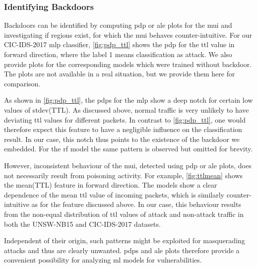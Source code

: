 \documentclass[10pt,sigconf,letterpaper,dvipsnames]{acmart}
\newcommand{\unsw}{UNSW-NB15}
\newcommand{\cic}{CIC-IDS-2017}
\begin{document}


\subsubsection{Identifying Backdoors}

Backdoors can be identified by computing \gls{pdp} or \gls{ale} plots for the \gls{mui} and investigating if regions exist, for which the \gls{mui} behaves counter-intuitive. For our \cic{} \gls{mlp} classifier, \autoref{fig:pdp_ttl} shows the \gls{pdp} for the \gls{ttl} value in forward direction, where the label 1 means classification as attack. We also provide plots for the corresponding models which were trained without backdoor. The plots are not available in a real situation, but we provide them here for comparison.

As shown in \autoref{fig:pdp_ttl}, the \glspl{pdp} for the \gls{mlp} show a deep notch for certain low values of stdev(TTL). As discussed above, normal traffic is very unlikely to have deviating \gls{ttl} values for different packets. In contrast to \autoref{fig:pdp_ttl}, one would therefore expect this feature to have a negligible influence on the classification result. In our case, this notch thus points to the existence of the backdoor we embedded. For the \gls{rf} model the same pattern is observed but omitted for brevity.

However, inconsistent behaviour of the \gls{mui}, detected using \gls{pdp} or \gls{ale} plots, does not necessarily result from poisoning activity.  For example, \autoref{fig:ttlmean} shows the mean(TTL) feature in forward direction. The models show a clear dependence of the mean \gls{ttl} value of incoming packets, which is similarly counter-intuitive as for the feature discussed above. In our case, this behaviour results from the non-equal distribution of \gls{ttl} values of attack and non-attack traffic in both the \unsw{} and \cic{} datasets.


Independent of their origin, such patterns might be exploited for masquerading attacks and thus are clearly unwanted.
\glspl{pdp} and \gls{ale} plots therefore provide a convenient possibility for analyzing \gls{ml} models for vulnerabilities. %
\end{document}
